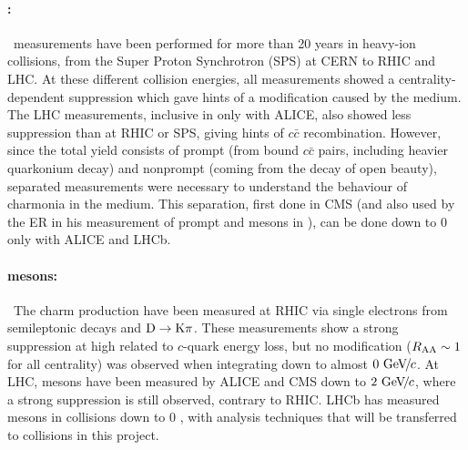 \documentclass[a4paper,11pt]{article}
\newcommand{\ER}{ER\xspace}
\begin{document}
\paragraph{\Jpsi:\ }\ 
\Jpsi measurements have been performed for more than 20 years in heavy-ion collisions, from the Super Proton Synchrotron (SPS) at CERN to RHIC and LHC. 
At these different collision energies, all measurements showed a centrality-dependent suppression
which gave hints of a modification caused by the medium. The LHC measurements, inclusive in \pt only with ALICE, also showed less
suppression than at RHIC or SPS, giving hints of $c\bar{c}$ recombination. However, since the total \Jpsi yield 
consists of prompt \Jpsi (from bound $c\bar{c}$ pairs, including heavier quarkonium decay) and nonprompt \Jpsi (coming
from the decay of open beauty), separated measurements were necessary to understand the behaviour of charmonia in the medium. 
This separation, first done in CMS (and also used by the \ER in his measurement of prompt \Jpsi and \psiP mesons in \pbpb), can be done down to 0 \pt only with ALICE 
and LHCb. 



\paragraph{\D mesons:\ }\ 
The charm production have been measured at RHIC via single
electrons from semileptonic decays and $\text{D} \to \text{K}\pi$. These measurements show a strong suppression at
high \pt related to $c$-quark energy loss, but no modification ($R_{\text{AA}} \sim 1$ for all centrality) was observed
when integrating down to almost $0\,{\,\text{Ge\hspace{-.08em}V\hspace{-0.16em}/\hspace{-0.08em}}c}$. 
At LHC, \D mesons have been measured by ALICE and CMS down to $2\,{\,\text{Ge\hspace{-.08em}V\hspace{-0.16em}/\hspace{-0.08em}}c}$, where
a strong suppression is still observed, contrary to RHIC. 
LHCb has measured \D mesons in \ppb collisions down to 0 \pt, with analysis techniques
that will be transferred to \pbpb collisions in this project.
\end{document}
